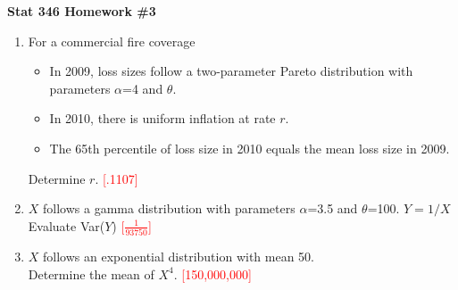 \documentclass{article}
\begin{document}
\begin{center}
\textbf{Stat 346 Homework \#3}\\
\vspace{0.3in}
\end{center}
\begin{enumerate}
\item
For a commercial fire coverage
	\begin{itemize}
	\item In 2009, loss sizes follow a two-parameter Pareto distribution with parameters $\alpha$=4 and $\theta$.
	\item In 2010, there is uniform inflation at rate $r$.
	\item The 65th percentile of loss size in 2010 equals the mean loss size in 2009.
	\end{itemize}
Determine $r$. \textcolor{red}{[.1107]}
\item
$X$ follows a gamma distribution with parameters $\alpha$=3.5 and $\theta$=100.
$Y=1/X$
\\Evaluate Var($Y$) \textcolor{red}{[$\frac{1}{93750}$]}

\item 
$X$ follows an exponential distribution with mean 50.\\Determine the mean of $X^4$. \textcolor{red}{[150,000,000]}


\end{enumerate}
\end{document}
